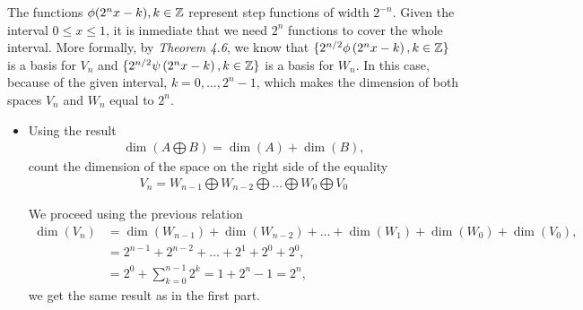 \begin{questions}

\begin{solution}
The functions $\phi(2^nx-k),k\in\mathbb{Z}$ represent step functions of width $2^{-n}$. Given the interval $0\leq x\leq 1$, it is inmediate that we need $2^n$ functions to cover the whole interval. More formally, by \textsl{Theorem 4.6}, we know that $\{2^{n/2}\phi\left(2^nx-k\right),k\in\mathbb{Z}\}$ is a basis for $V_n$ and $\{2^{n/2}\psi\left(2^nx-k\right),k\in\mathbb{Z}\}$ is a basis for $W_n$. In this case, because of the given interval, $k=0,\dots,2^n-1$, which makes the dimension of both spaces $V_n$ and $W_n$ equal to $2^n$.
\end{solution}
\begin{itemize}
\item Using the result
\begin{align*}
\dim(A\bigoplus B)=\dim(A)+\dim(B),
\end{align*}
count the dimension of the space on the right side of the equality
\begin{align*}
V_n=W_{n-1}\bigoplus W_{n-2}\bigoplus\dots \bigoplus W_0\bigoplus V_0
\end{align*}
\begin{solution}
We proceed using the previous relation
\begin{align*}
\dim\left(V_n\right)&=\dim\left(W_{n-1}\right)+\dim\left(W_{n-2}\right)+\dots+\dim\left(W_1\right)+\dim\left(W_0\right)+\dim\left(V_0\right),\\
&=2^{n-1}+2^{n-2}+\dots+2^{1}+2^{0}+2^{0},\\
&=2^{0}+\sum_{k=0}^{n-1}2^k=1+2^n-1=2^n,
\end{align*}
we get the same result as in the first part.
\end{solution}
\end{itemize}
\end{questions}
